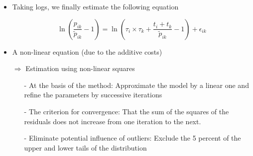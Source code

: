 \documentclass[10 pt,Helvetica, french]{beamer}
\begin{document}
\begin{frame} 
\begin{itemize}
\item Taking logs, we finally estimate the following equation

\begin{equation}
\ln\left(\frac{p_{ik}}{\widetilde{p}_{ik}}-1 \right)= \ln \left(\tau_{i} \times \tau_{k}+\frac{t_{i} + t_{k}}{\widetilde{p}_{ik}}-1 \right) + \epsilon_{ik} \label{eq:est_equation}
\end{equation}
\vspace{0.1cm}
\item A non-linear equation (due to the additive costs)  \vspace{0.1cm}
\item[$\Rightarrow$] Estimation using non-linear squares \vspace{0.1cm}
\begin{itemize}
\item[-] At the basis of the method: Approximate the model by a linear one and refine the parameters by successive iterations \vspace{0.1cm}
\item[-] The criterion for convergence: That the sum of the squares of the residuals does not increase from one iteration to the next. \vspace{0.1cm}
\item[-] Eliminate potential influence of outliers: Exclude the 5 percent of the upper and lower tails of the distribution \vspace{0.1cm}
\end{itemize}
\end{itemize}
\end{frame}
\end{document}
